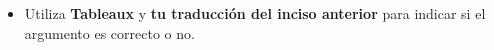 \documentclass[oneside]{style}
\begin{document}
\begin{questions}[label=\protect\circled{\bfseries\arabic*}]
{\begin{itemize}
            \item Utiliza \textbf{Tableaux} y \textbf{tu traducción del inciso 
            anterior} para indicar si el argumento es correcto o no. 
        \end{itemize}
    }
\end{questions}
\end{document}
